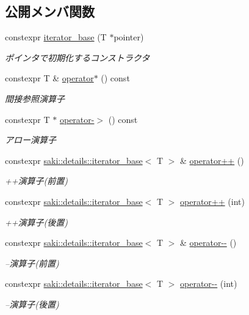 \subsection*{公開メンバ関数}
\begin{DoxyCompactItemize}
\item 
constexpr \mbox{\hyperlink{classsaki_1_1details_1_1iterator__base_a8fc711c3742cad39433fc3de560900f8}{iterator\+\_\+base}} (T $\ast$pointer)
\begin{DoxyCompactList}\small\item\em ポインタで初期化するコンストラクタ \end{DoxyCompactList}\item 
constexpr T \& \mbox{\hyperlink{classsaki_1_1details_1_1iterator__base_a621d7cd415fd0be31f666b54fadaf039}{operator$\ast$}} () const
\begin{DoxyCompactList}\small\item\em 間接参照演算子 \end{DoxyCompactList}\item 
constexpr T $\ast$ \mbox{\hyperlink{classsaki_1_1details_1_1iterator__base_a34d98882fa35d0c48ffe5a29c1a1f4cf}{operator-\/$>$}} () const
\begin{DoxyCompactList}\small\item\em アロー演算子 \end{DoxyCompactList}\item 
constexpr \mbox{\hyperlink{classsaki_1_1details_1_1iterator__base}{saki\+::details\+::iterator\+\_\+base}}$<$ T $>$ \& \mbox{\hyperlink{classsaki_1_1details_1_1iterator__base_a1539e90e42dd7208401df3ad5f6385b1}{operator++}} ()
\begin{DoxyCompactList}\small\item\em ++演算子(前置) \end{DoxyCompactList}\item 
constexpr \mbox{\hyperlink{classsaki_1_1details_1_1iterator__base}{saki\+::details\+::iterator\+\_\+base}}$<$ T $>$ \mbox{\hyperlink{classsaki_1_1details_1_1iterator__base_a47eb0dcb7d0467879a64eb252079d617}{operator++}} (int)
\begin{DoxyCompactList}\small\item\em ++演算子(後置) \end{DoxyCompactList}\item 
constexpr \mbox{\hyperlink{classsaki_1_1details_1_1iterator__base}{saki\+::details\+::iterator\+\_\+base}}$<$ T $>$ \& \mbox{\hyperlink{classsaki_1_1details_1_1iterator__base_abd955d1a288f42f0231f22c8a1e73040}{operator-\/-\/}} ()
\begin{DoxyCompactList}\small\item\em --演算子(前置) \end{DoxyCompactList}\item 
constexpr \mbox{\hyperlink{classsaki_1_1details_1_1iterator__base}{saki\+::details\+::iterator\+\_\+base}}$<$ T $>$ \mbox{\hyperlink{classsaki_1_1details_1_1iterator__base_a916d333d66267d52916eb442b092ed68}{operator-\/-\/}} (int)
\begin{DoxyCompactList}\small\item\em --演算子(後置) \end{DoxyCompactList}\end{DoxyCompactItemize}
